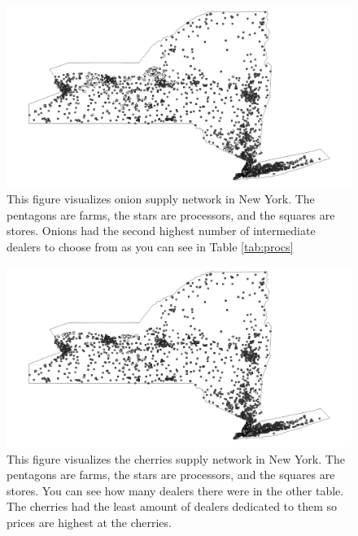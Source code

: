 \documentclass{report}
\begin{document}
\begin{figure}
\centering
\begin{framed}
\includegraphics[scale=.50]{network_49}
\caption{This figure visualizes onion supply network in New York. The pentagons are farms, the stars are processors, and the squares are stores. Onions had the second highest number of intermediate dealers to choose from as you can see in Table \ref{tab:procs}}
\label{fig:network_49}
\end{framed}
\end{figure}

\begin{figure}
\centering
\begin{framed}
\includegraphics[scale=.50]{network_66}
\caption{This figure visualizes the cherries supply network in New York. The pentagons are farms, the stars are processors, and the squares are stores. You can see how many dealers there were in the other table. The cherries had the least amount of dealers dedicated to them so prices are highest at the cherries.}
\label{fig:network_66}
\end{framed}
\end{figure}
\end{document}
